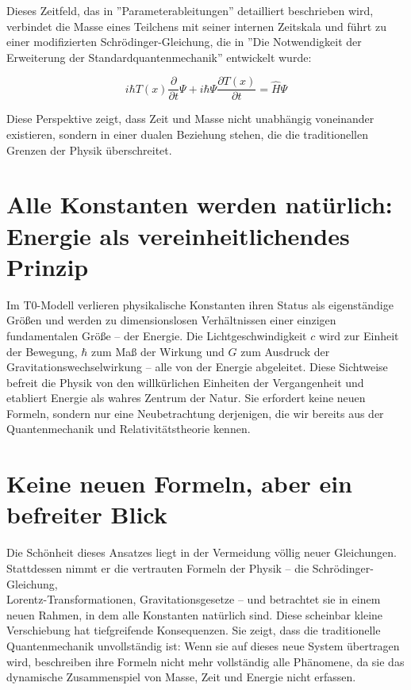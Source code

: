 \documentclass[a4paper,12pt]{article}
\newcommand{\Tfield}{T(x)}
\begin{document}
	Dieses Zeitfeld, das in ''Parameterableitungen'' \cite{pascher_params_2025} detailliert beschrieben wird, verbindet die Masse eines Teilchens mit seiner internen Zeitskala und führt zu einer modifizierten Schrödinger-Gleichung, die in ''Die Notwendigkeit der Erweiterung der Standardquantenmechanik'' \cite{pascher_erweiterung_2025} entwickelt wurde:
	
	\begin{equation}
		i\hbar \Tfield \frac{\partial}{\partial t} \Psi + i\hbar \Psi \frac{\partial \Tfield}{\partial t} = \hat{H} \Psi
	\end{equation}
	
	Diese Perspektive zeigt, dass Zeit und Masse nicht unabhängig voneinander existieren, sondern in einer dualen Beziehung stehen, die die traditionellen Grenzen der Physik überschreitet.
	
	\section{Alle Konstanten werden natürlich: Energie als vereinheitlichendes Prinzip}
	
	Im T0-Modell verlieren physikalische Konstanten ihren Status als eigenständige Größen und werden zu dimensionslosen Verhältnissen einer einzigen fundamentalen Größe – der Energie. Die Lichtgeschwindigkeit \(c\) wird zur Einheit der Bewegung, \(\hbar\) zum Maß der Wirkung und \(G\) zum Ausdruck der Gravitationswechselwirkung – alle von der Energie abgeleitet. Diese Sichtweise befreit die Physik von den willkürlichen Einheiten der Vergangenheit und etabliert Energie als wahres Zentrum der Natur. Sie erfordert keine neuen Formeln, sondern nur eine Neubetrachtung derjenigen, die wir bereits aus der Quantenmechanik und Relativitätstheorie kennen.
	
	\section{Keine neuen Formeln, aber ein befreiter Blick}
	
	Die Schönheit dieses Ansatzes liegt in der Vermeidung völlig neuer Gleichungen. Stattdessen nimmt er die vertrauten Formeln der Physik – die Schrödinger-Gleichung, \\Lorentz-Transformationen, Gravitationsgesetze – und betrachtet sie in einem neuen Rahmen, in dem alle Konstanten natürlich sind. Diese scheinbar kleine Verschiebung hat tiefgreifende Konsequenzen. Sie zeigt, dass die traditionelle Quantenmechanik unvollständig ist: Wenn sie auf dieses neue System übertragen wird, beschreiben ihre Formeln nicht mehr vollständig alle Phänomene, da sie das dynamische Zusammenspiel von Masse, Zeit und Energie nicht erfassen.
	
\end{document}
